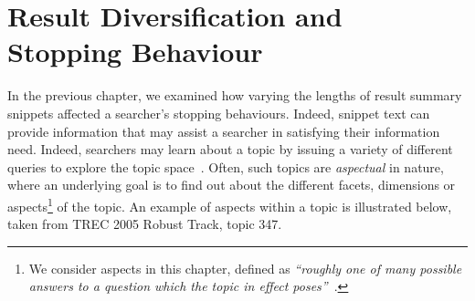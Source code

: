 
\chapter[Result Diversification and Stopping Behaviour]{Result Diversification and\\Stopping Behaviour}\label{chap:diversity}
In the previous chapter, we examined how varying the lengths of result summary snippets affected a searcher's stopping behaviours. Indeed, snippet text can provide information that may assist a searcher in satisfying their information need. Indeed, searchers may learn about a topic by issuing a variety of different queries to explore the topic space~\citep{kelly2015search_tasks}. Often, such topics are \emph{aspectual} in nature, where an underlying goal is to find out about the different facets, dimensions or aspects\footnote{We consider aspects in this chapter, defined as \emph{``roughly one of many possible answers to a question which the topic in effect poses''}~\citep{over1998trec}.} of the topic. An example of aspects within a topic is illustrated below, taken from TREC 2005 Robust Track, topic 347.


\begin{figure}[h]
    \centering
    \vspace{4mm}
    \label{fig:aspectsintro}
    \vspace{-5mm}
\end{figure}

